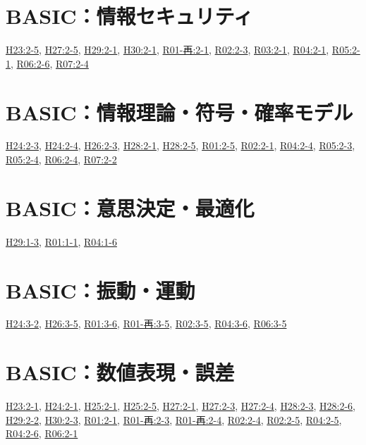 \section{BASIC：情報セキュリティ}
\hyperref[q:h23-reg-basic-2-5]{H23:2-5}, \hyperref[q:h27-reg-basic-2-5]{H27:2-5}, \hyperref[q:h29-reg-basic-2-1]{H29:2-1}, \hyperref[q:h30-reg-basic-2-1]{H30:2-1}, \hyperref[q:r01-ret-basic-2-1]{R01-再:2-1}, \hyperref[q:r02-reg-basic-2-3]{R02:2-3}, \hyperref[q:r03-reg-basic-2-1]{R03:2-1}, \hyperref[q:r04-reg-basic-2-1]{R04:2-1}, \hyperref[q:r05-reg-basic-2-1]{R05:2-1}, \hyperref[q:r06-reg-basic-2-6]{R06:2-6}, \hyperref[q:r07-reg-basic-2-4]{R07:2-4}
\section{BASIC：情報理論・符号・確率モデル}
\hyperref[q:h24-reg-basic-2-3]{H24:2-3}, \hyperref[q:h24-reg-basic-2-4]{H24:2-4}, \hyperref[q:h26-reg-basic-2-3]{H26:2-3}, \hyperref[q:h28-reg-basic-2-1]{H28:2-1}, \hyperref[q:h28-reg-basic-2-5]{H28:2-5}, \hyperref[q:r01-reg-basic-2-5]{R01:2-5}, \hyperref[q:r02-reg-basic-2-1]{R02:2-1}, \hyperref[q:r04-reg-basic-2-4]{R04:2-4}, \hyperref[q:r05-reg-basic-2-3]{R05:2-3}, \hyperref[q:r05-reg-basic-2-4]{R05:2-4}, \hyperref[q:r06-reg-basic-2-4]{R06:2-4}, \hyperref[q:r07-reg-basic-2-2]{R07:2-2}
\section{BASIC：意思決定・最適化}
\hyperref[q:h29-reg-basic-1-3]{H29:1-3}, \hyperref[q:r01-reg-basic-1-1]{R01:1-1}, \hyperref[q:r04-reg-basic-1-6]{R04:1-6}
\section{BASIC：振動・運動}
\hyperref[q:h24-reg-basic-3-2]{H24:3-2}, \hyperref[q:h26-reg-basic-3-5]{H26:3-5}, \hyperref[q:r01-reg-basic-3-6]{R01:3-6}, \hyperref[q:r01-ret-basic-3-5]{R01-再:3-5}, \hyperref[q:r02-reg-basic-3-5]{R02:3-5}, \hyperref[q:r04-reg-basic-3-6]{R04:3-6}, \hyperref[q:r06-reg-basic-3-5]{R06:3-5}
\section{BASIC：数値表現・誤差}
\hyperref[q:h23-reg-basic-2-1]{H23:2-1}, \hyperref[q:h24-reg-basic-2-1]{H24:2-1}, \hyperref[q:h25-reg-basic-2-1]{H25:2-1}, \hyperref[q:h25-reg-basic-2-5]{H25:2-5}, \hyperref[q:h27-reg-basic-2-1]{H27:2-1}, \hyperref[q:h27-reg-basic-2-3]{H27:2-3}, \hyperref[q:h27-reg-basic-2-4]{H27:2-4}, \hyperref[q:h28-reg-basic-2-3]{H28:2-3}, \hyperref[q:h28-reg-basic-2-6]{H28:2-6}, \hyperref[q:h29-reg-basic-2-2]{H29:2-2}, \hyperref[q:h30-reg-basic-2-3]{H30:2-3}, \hyperref[q:r01-reg-basic-2-1]{R01:2-1}, \hyperref[q:r01-ret-basic-2-3]{R01-再:2-3}, \hyperref[q:r01-ret-basic-2-4]{R01-再:2-4}, \hyperref[q:r02-reg-basic-2-4]{R02:2-4}, \hyperref[q:r02-reg-basic-2-5]{R02:2-5}, \hyperref[q:r04-reg-basic-2-5]{R04:2-5}, \hyperref[q:r04-reg-basic-2-6]{R04:2-6}, \hyperref[q:r06-reg-basic-2-1]{R06:2-1}
